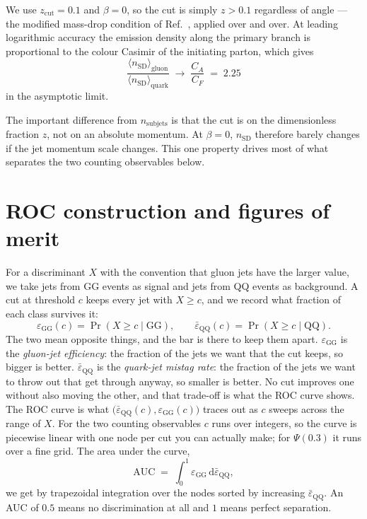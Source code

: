 \documentclass[reprint,amsmath,amssymb,aps,prd,floatfix]{revtex4-2}
\begin{document}
We use $z_{\mathrm{cut}} = 0.1$ and $\beta = 0$, so the cut is simply $z > 0.1$
regardless of angle --- the modified mass-drop condition of
Ref.~\cite{Dasgupta:2013ihk}, applied over and over. At leading logarithmic
accuracy the emission density along the primary branch is proportional to the
colour Casimir of the initiating parton, which gives
\begin{equation}
\frac{\langle n_{\mathrm{SD}}\rangle_{\mathrm{gluon}}}
     {\langle n_{\mathrm{SD}}\rangle_{\mathrm{quark}}}
\;\longrightarrow\; \frac{C_A}{C_F} \;=\; 2.25
\label{eq:casimir}
\end{equation}
in the asymptotic limit.

The important difference from $n_{\mathrm{subjets}}$ is that the cut is on the
dimensionless fraction $z$, not on an absolute momentum. At $\beta = 0$,
$n_{\mathrm{SD}}$ therefore barely changes if the jet momentum scale changes.
This one property drives most of what separates the two counting observables
below.

\section{ROC construction and figures of merit}\label{sec:roc}

For a discriminant $X$ with the convention that gluon jets have the larger
value, we take jets from GG events as signal and jets from QQ events as
background. A cut at threshold $c$ keeps every jet with $X \ge c$, and we
record what fraction of each class survives it:
\begin{equation}
\varepsilon_{\mathrm{GG}}(c) = \Pr(X \ge c \mid \mathrm{GG}), \qquad
\bar{\varepsilon}_{\mathrm{QQ}}(c) = \Pr(X \ge c \mid \mathrm{QQ}).
\end{equation}
The two mean opposite things, and the bar is there to keep them apart.
$\varepsilon_{\mathrm{GG}}$ is the \emph{gluon-jet efficiency}: the fraction of
the jets we want that the cut keeps, so bigger is better.
$\bar{\varepsilon}_{\mathrm{QQ}}$ is the \emph{quark-jet mistag rate}: the
fraction of the jets we want to throw out that get through anyway, so smaller
is better. No cut improves one without also moving the other, and that
trade-off is what the ROC curve shows.
The ROC curve is what
$\bigl(\bar{\varepsilon}_{\mathrm{QQ}}(c), \varepsilon_{\mathrm{GG}}(c)\bigr)$ traces
out as $c$ sweeps across the range of $X$. For the two counting observables $c$
runs over integers, so the curve is piecewise linear with one node per cut you
can actually make; for $\Psi(0.3)$ it runs over a fine grid. The area under the
curve,
\begin{equation}
\mathrm{AUC} \;=\; \int_0^1 \varepsilon_{\mathrm{GG}}\,
\mathrm{d}\bar{\varepsilon}_{\mathrm{QQ}},
\end{equation}
we get by trapezoidal integration over the nodes sorted by increasing
$\bar{\varepsilon}_{\mathrm{QQ}}$. An AUC of $0.5$ means no discrimination at all and
$1$ means perfect separation.
\end{document}
